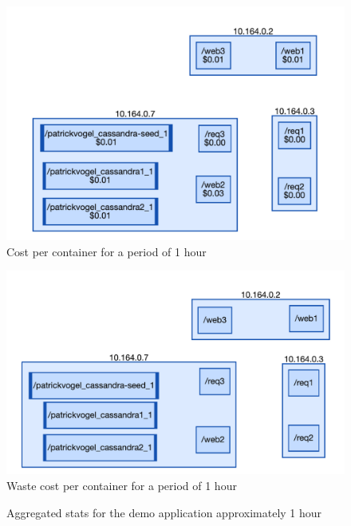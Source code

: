 \begin{figure}
    \centering
    \includegraphics[width=\textwidth]{gfx/demo_cost}
    \caption{Cost per container for a period of 1 hour}
    \label{fig:demo_cost}
\end{figure}

\begin{figure}
    \centering
    \includegraphics[width=\textwidth]{gfx/demo_app}
    \caption{Waste cost per container for a period of 1 hour}
    \label{fig:demo_waste}
\end{figure}

\begin{figure}
    \centering
    
    \caption{Aggregated stats for the demo application approximately 1 hour}
    \label{fig:demo_stats}
\end{figure}


